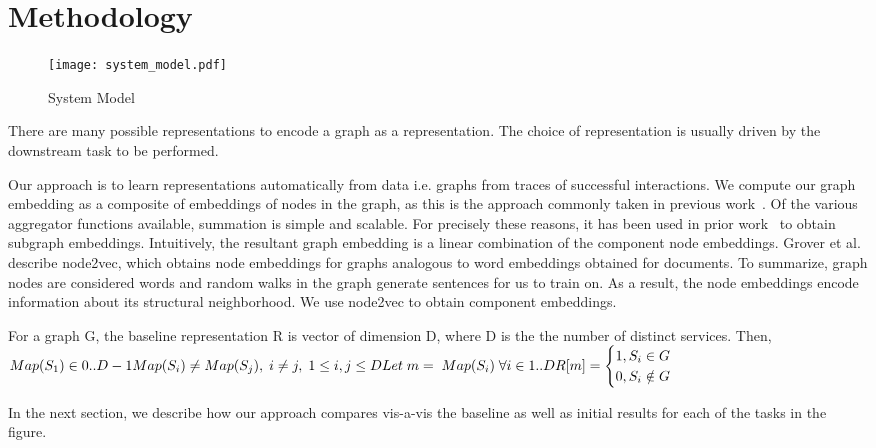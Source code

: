 \section{Methodology}
\begin{figure}[h]
\begin{center}
\texttt{[image: system\_model.pdf]}
\caption{System Model} 
\label{System_model}
\end{center}
\end{figure}

There are many possible representations to encode a graph as a representation. The choice of representation is usually driven by the downstream task to be performed. 

Our approach is to learn representations automatically from data i.e. graphs from traces of successful interactions. We compute our graph embedding as a composite of embeddings of nodes in the graph, as this is the approach commonly taken in previous work~\cite{corr_2017_abs-1709-05584}.
Of the various aggregator functions available, summation is simple and scalable. For precisely these reasons, it has been used in prior work~\cite{DBLP:journals/corr/DuvenaudMAGHAA15, DBLP:journals/corr/DaiDS16} to obtain subgraph embeddings. Intuitively, the resultant graph embedding is a linear combination of the component node embeddings. 
Grover et al.~\cite{corr18_GroverL16} describe node2vec, which obtains node embeddings for graphs analogous to word embeddings obtained for documents. To summarize, graph nodes are considered words and random walks in the graph generate sentences for us to train on. As a result, the node embeddings encode information about its structural neighborhood. We use node2vec to obtain component embeddings.  

For a graph G, the baseline representation R is vector of dimension D, where D is the the number of distinct services. Then, \newline
\begin{math}
Map(S_{1}) \in {0..D-1} \\
Map(S_{i}) \neq Map(S_{j}),\;  i \neq j,\; 1 \leq i,j \leq D \\
    Let\; m =\; Map(S_{i})\; \forall i \in {1..D} \\
    R[m] = 
    \begin{cases}
        1, S_{i} \in G \\
        0, S_{i} \notin G \\
    \end{cases}
\end{math}

In the next section, we describe how our approach compares vis-a-vis the baseline as well as initial results for each of the tasks in the figure.
